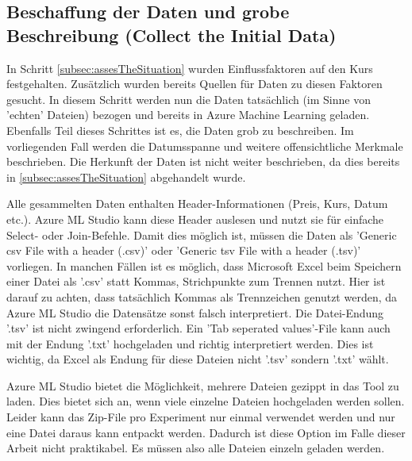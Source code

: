 \subsection{Beschaffung der Daten und grobe Beschreibung (Collect the Initial Data)} \label{subsec:collection}
In Schritt \ref{subsec:assesTheSituation} wurden Einflussfaktoren auf den Kurs festgehalten. Zusätzlich wurden bereits Quellen für Daten zu diesen Faktoren gesucht. In diesem Schritt werden nun die Daten tatsächlich (im Sinne von 'echten' Dateien) bezogen und bereits in Azure Machine Learning geladen. Ebenfalls Teil dieses Schrittes ist es, die Daten grob zu beschreiben. Im vorliegenden Fall werden die Datumsspanne und weitere offensichtliche Merkmale beschrieben. Die Herkunft der Daten ist nicht weiter beschrieben, da dies bereits in \ref{subsec:assesTheSituation} abgehandelt wurde.\par
Alle gesammelten Daten enthalten Header-Informationen (Preis, Kurs, Datum etc.). Azure ML Studio kann diese Header auslesen und nutzt sie für einfache Select- oder Join-Befehle. Damit dies möglich ist, müssen die Daten als 'Generic \gls{csv} File with a header (.csv)' oder 'Generic \gls{tsv} File with a header (.tsv)' vorliegen. In manchen Fällen ist es möglich, dass Microsoft Excel beim Speichern einer Datei als '.csv' statt Kommas, Strichpunkte zum Trennen nutzt. Hier ist darauf zu achten, dass tatsächlich Kommas als Trennzeichen genutzt werden, da Azure ML Studio die Datensätze sonst falsch interpretiert. Die Datei-Endung '.tsv' ist nicht zwingend erforderlich. Ein 'Tab seperated values'-File kann auch mit der Endung '.txt' hochgeladen und richtig interpretiert werden. Dies ist wichtig, da Excel als Endung für diese Dateien nicht '.tsv' sondern '.txt' wählt.\par
Azure ML Studio bietet die Möglichkeit, mehrere Dateien gezippt in das Tool zu laden. Dies bietet sich an, wenn viele einzelne Dateien hochgeladen werden sollen. Leider kann das Zip-File pro Experiment nur einmal verwendet werden und nur eine Datei daraus kann entpackt werden. Dadurch ist diese Option im Falle dieser Arbeit nicht praktikabel. Es müssen also alle Dateien einzeln geladen werden.

